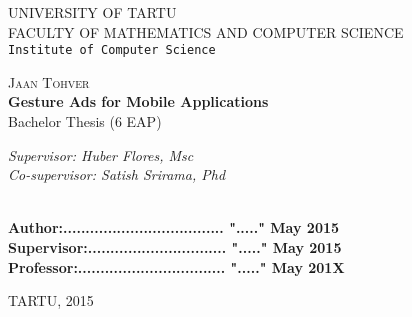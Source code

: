 \begin{titlepage}

\begin{center}



\textsc{UNIVERSITY OF TARTU}\\

\textsc{FACULTY OF MATHEMATICS AND COMPUTER SCIENCE}\\

\texttt{Institute of Computer Science}\\

\vspace{6 cm}


\textsc{ \large Jaan Tohver}\\[0.5cm]
{ \Huge \bfseries Gesture Ads for Mobile Applications}\\[0.5cm]
{\large Bachelor Thesis (6 EAP)}\\[3cm]



\begin{minipage}{0.8\textwidth}
\begin{flushright} \large
\emph{Supervisor: Huber Flores, Msc}  \\
\emph{Co-supervisor: Satish Srirama, Phd}  \\	  %
\end{flushright}
\end{minipage}

\textbf{}\\[1.0cm]

\textbf{Author:.................................... "....." May   2015}\\[0.5cm]

\textbf{Supervisor:............................... "....." May   2015}\\[0.5cm]

\textbf{Professor:................................. "....." May   201X}\\[0.5cm]        

\vfill

{\large TARTU, 2015}

\end{center}

\end{titlepage}

